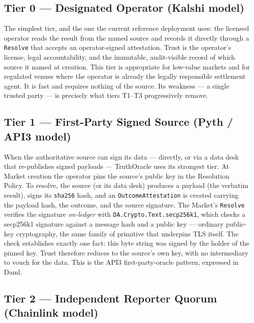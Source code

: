 \documentclass[11pt,a4paper]{article}
\begin{document}
\subsection{Tier 0 --- Designated Operator (Kalshi model)}

The simplest tier, and the one the current reference deployment uses: the licensed operator reads the result from the named source and records it directly through a \texttt{Resolve} that accepts an operator-signed attestation. Trust is the operator's license, legal accountability, and the immutable, audit-visible record of which source it named at creation. This tier is appropriate for low-value markets and for regulated venues where the operator is already the legally responsible settlement agent. It is fast and requires nothing of the source. Its weakness --- a single trusted party --- is precisely what tiers T1--T3 progressively remove.

\subsection{Tier 1 --- First-Party Signed Source (Pyth / API3 model)}

\begin{sloppypar}
When the authoritative source can sign its data --- directly, or via a data desk that re-publishes signed payloads --- TruthOracle uses its strongest tier. At Market creation the operator pins the source's public key in the Resolution Policy. To resolve, the source (or its data desk) produces a payload (the verbatim result), signs its \texttt{sha256} hash, and an \texttt{OutcomeAttestation} is created carrying the payload hash, the outcome, and the source signature. The Market's \texttt{Resolve} verifies the signature \emph{on-ledger} with \texttt{DA.Crypto.Text.secp256k1}, which checks a secp256k1 signature against a message hash and a public key --- ordinary public-key cryptography, the same family of primitive that underpins TLS itself. The check establishes exactly one fact: this byte string was signed by the holder of the pinned key. Trust therefore reduces to the source's own key, with no intermediary to vouch for the data. This is the API3 first-party-oracle pattern, expressed in Daml.
\end{sloppypar}

\subsection{Tier 2 --- Independent Reporter Quorum (Chainlink model)}
\end{document}

